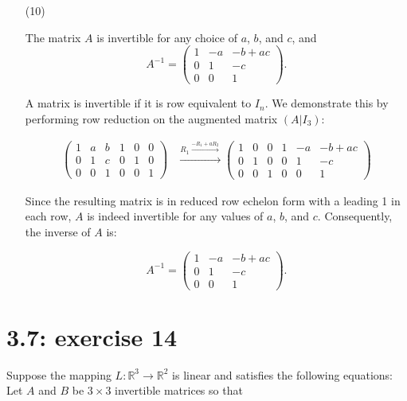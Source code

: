 \documentclass{report}
\begin{document}
\begin{enumerate}
\item[(10)]

The matrix $A$ is invertible for any choice of $a$, $b$, and $c$, and
\[
A^{-1} = \begin{pmatrix} 1 & -a & -b + ac \\ 0 & 1 & -c \\ 0 & 0 & 1 \end{pmatrix}.
\]

A matrix is invertible if it is row equivalent to $I_n$. We demonstrate this by performing row reduction on the augmented matrix $(A|I_3)$:

\begin{align*}
\left( \begin{array}{rrr|rrr}
1 & a & b & 1 & 0 & 0 \\
0 & 1 & c & 0 & 1 & 0 \\
0 & 0 & 1 & 0 & 0 & 1
\end{array} \right) &\xrightarrow{R_1 \xrightarrow{-R_1+aR_2}} 
\left( \begin{array}{rrr|rrc}
1 & 0 & 0 & 1 & -a & -b + ac \\
0 & 1 & 0 & 0 & 1 & -c \\
0 & 0 & 1 & 0 & 0 & 1
\end{array} \right)
\end{align*}

Since the resulting matrix is in reduced row echelon form with a leading 1 in each row, $A$ is indeed invertible for any values of $a$, $b$, and $c$. Consequently, the inverse of $A$ is:

$$A^{-1} = \boxed{\begin{pmatrix} 1 & -a & -b + ac \\ 0 & 1 & -c \\ 0 & 0 & 1 \end{pmatrix}}.$$

\end{enumerate}







\section*{3.7: exercise 14} 
Suppose the mapping $L: \mathbb{R}^3 \to \mathbb{R}^2$ is linear and satisfies the following equations:
Let $A$ and $B$ be $3\times 3$ invertible matrices so that
\end{document}

